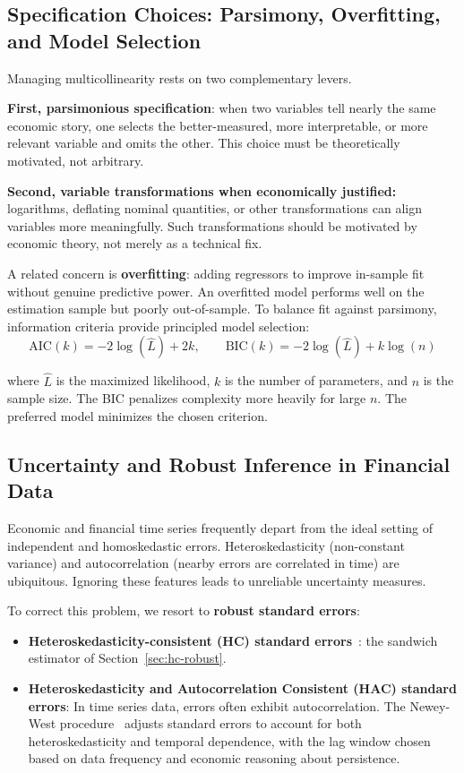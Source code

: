\subsection{Specification Choices: Parsimony, Overfitting, and Model Selection}

Managing multicollinearity rests on two complementary levers.

\textbf{First, parsimonious specification}: when two variables tell nearly the same economic story, one selects the better-measured, more interpretable, or more relevant variable and omits the other. This choice must be theoretically motivated, not arbitrary.

\textbf{Second, variable transformations when economically justified:} logarithms, deflating nominal quantities, or other transformations can align variables more meaningfully. Such transformations should be motivated by economic theory, not merely as a technical fix.

A related concern is \textbf{overfitting}: adding regressors to improve in-sample fit without genuine predictive power. An overfitted model performs well on the estimation sample but poorly out-of-sample. To balance fit against parsimony, information criteria provide principled model selection:
$$\text{AIC}(k) = -2\log(\hat{L}) + 2k, \qquad \text{BIC}(k) = -2\log(\hat{L}) + k\log(n)$$

where $\hat{L}$ is the maximized likelihood, $k$ is the number of parameters, and $n$ is the sample size. The BIC penalizes complexity more heavily for large $n$. The preferred model minimizes the chosen criterion.
\subsection{Uncertainty and Robust Inference in Financial Data}

Economic and financial time series frequently depart from the ideal setting of independent and homoskedastic errors. Heteroskedasticity (non-constant variance) and autocorrelation (nearby errors are correlated in time) are ubiquitous. Ignoring these features leads to unreliable uncertainty measures.

To correct this problem, we resort to \textbf{robust standard errors}:
\begin{itemize}
    \item \textbf{Heteroskedasticity-consistent (HC) standard errors}~\cite{White1980}: the sandwich estimator of Section~\ref{sec:hc-robust}.
  \item \textbf{Heteroskedasticity and Autocorrelation Consistent (HAC) standard errors}: In time series data, errors often exhibit autocorrelation. The Newey-West procedure~\cite{NeweyWest1987} adjusts standard errors to account for both heteroskedasticity and temporal dependence, with the lag window chosen based on data frequency and economic reasoning about persistence.
\end{itemize}

